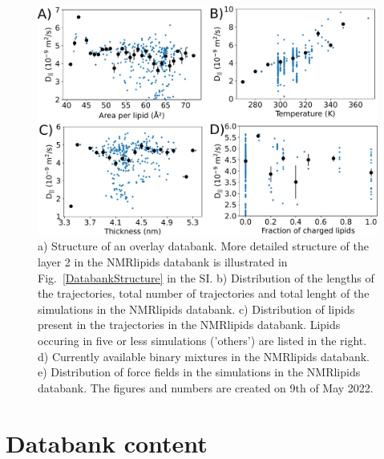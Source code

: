 \documentclass[fleqn,10pt]{wlscirep}
\begin{document}
\begin{figure}[!h]
    \centering
    \includegraphics[width = 180mm]{Figures/LateralDiffusionSI.pdf}
    \caption{a) Structure of an overlay databank. 
    More detailed structure of the layer 2 in the NMRlipids databank is illustrated in Fig.~\ref{DatabankStructure} in the SI.
    b) Distribution of the lengths of the trajectories, total number of trajectories and total lenght of the simulations in the NMRlipids databank.
    c) Distribution of lipids present in the trajectories in the NMRlipids databank. Lipids occuring in five or less simulations ('others') are listed in the right. 
    d) Currently available binary mixtures in the NMRlipids databank. 
    e) Distribution of force fields in the simulations in the NMRlipids databank.
    The figures and numbers are created on 9th of May 2022.}
    \label{fig:diffusionSI}
\end{figure}

\pagebreak
\section{Databank content}
\end{document}
